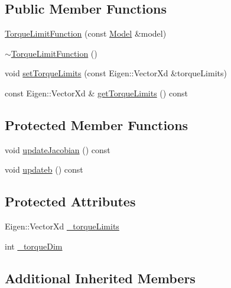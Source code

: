 \subsection*{Public Member Functions}
\begin{DoxyCompactItemize}
\item 
\hyperlink{classocra_1_1TorqueLimitFunction_a3ca04338256c4a0bf484f29dc7aeb06d}{Torque\+Limit\+Function} (const \hyperlink{classocra_1_1Model}{Model} \&model)
\item 
\hyperlink{classocra_1_1TorqueLimitFunction_a810eb8dd094bb809859a6adf9c6c4a18}{$\sim$\+Torque\+Limit\+Function} ()
\item 
void \hyperlink{classocra_1_1TorqueLimitFunction_a038250b745913584724401ea719177a5}{set\+Torque\+Limits} (const Eigen\+::\+Vector\+Xd \&torque\+Limits)
\item 
const Eigen\+::\+Vector\+Xd \& \hyperlink{classocra_1_1TorqueLimitFunction_a455115a2dc26da5603bbf843bb88ef38}{get\+Torque\+Limits} () const
\end{DoxyCompactItemize}
\subsection*{Protected Member Functions}
\begin{DoxyCompactItemize}
\item 
void \hyperlink{classocra_1_1TorqueLimitFunction_ad33a9f6f6af6edd6b3c0cda6f915336b}{update\+Jacobian} () const
\item 
void \hyperlink{classocra_1_1TorqueLimitFunction_a157cb13ffdc53d3a7ed568b59154b0d0}{updateb} () const
\end{DoxyCompactItemize}
\subsection*{Protected Attributes}
\begin{DoxyCompactItemize}
\item 
Eigen\+::\+Vector\+Xd \hyperlink{classocra_1_1TorqueLimitFunction_a929154bb1273971f123d12ce810fd375}{\+\_\+torque\+Limits}
\item 
int \hyperlink{classocra_1_1TorqueLimitFunction_ae7eed81decd37aa8bb6baeb47c5fb4d0}{\+\_\+torque\+Dim}
\end{DoxyCompactItemize}
\subsection*{Additional Inherited Members}


